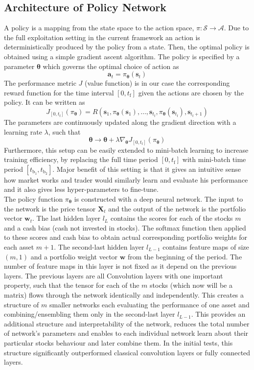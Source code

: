 \documentclass{article}
\begin{document}
\subsection{Architecture of Policy Network}

A policy is a mapping from the state space to the action space, $\pi : \mathcal{S} \rightarrow \mathcal{A}$. Due to the full exploitation setting in the current framework an action is deterministically produced by the policy from a state. Then, the optimal policy is obtained using a simple gradient ascent algorithm. The policy is specified by a parameter $\bm{\theta}$ which governs the optimal choice of action as
\[ \bm{a}_t = \pi_{\bm{\theta}}(\bm{s}_t)\]
The performance metric $J$ (value function) is in our case the corresponding reward function for the time interval 
$[0,t_\text{f}]$ given the actions are chosen by the policy. It can be written as
\[ J_{[0,t_\text{f}]} (\pi_{\bm{\theta}} ) =  R \left(\bm{s}_1,\pi_{\bm{\theta}}(\bm{s}_1),\ldots,\bm{s}_{t_\text{f}}, \pi_{\bm{\theta}}(\bm{s}_{t_{\text{f}}}), \bm{s}_{t_\text{f}+1} \right)\] 
The parameters are continuously updated along the gradient direction with a learning rate $\lambda$, such that 
\[ \bm{\theta} \rightarrow \bm{\theta}+\lambda \nabla_{\bm{\theta}} J_{[0,t_\text{f}]} (\pi_{\bm{\theta}} ) \]
Furthermore, this setup can be easily extended to mini-batch learning to increase training efficiency, by replacing the full time period $[0,t_\text{f}]$ with mini-batch time period $[t_{\text{b}_1},t_{\text{b}_2}]$. Major benefit of this setting is that it gives an intuitive sense how market works and trader would similarly learn and evaluate his performance and it also gives less hyper-parameters to fine-tune. \\

The policy function $\pi_{\bm{\theta}}$ is constructed with a deep neural network. The input to the network is the price tensor $\bm{X}_t$ and the output of the network is the portfolio vector $\bm{w}_t$. The last hidden layer $l_L$ contains the scores for each of the stocks $m$ and a cash bias (cash not invested in stocks). The softmax function then applied to these scores and cash bias to obtain actual corresponding portfolio weights for each asset $m+1$. The second-last hidden layer $l_{L-1}$ contains feature maps of size $(m,1)$ and a portfolio weight vector $\bm{w}$ from the beginning of the period. The number of feature maps in this layer is not fixed as it depend on the previous layers. The previous layers are all Convolution layers with one important property, such that the tensor for each of the $m$ stocks (which now will be a matrix) flows through the network identically and independently. This creates a structure of $m$ smaller networks each evaluating the performance of one asset and combining/ensembling them only in the second-last layer $l_{L-1}$. This provides an additional structure and interpretability of the network, reduces the total number of network's parameters and enables to each individual network learn about their particular stocks behaviour and later combine them. In the initial tests, this structure significantly outperformed classical convolution layers or fully connected layers.
\end{document}
